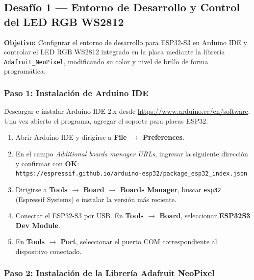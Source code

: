 \documentclass[12pt,leqno]{article}
\begin{document}
\bigskip

\subsection{Desaf\'io 1 --- Entorno de Desarrollo y Control del LED RGB WS2812}
\label{sec:desafio1}

\textbf{Objetivo:} Configurar el entorno de desarrollo para ESP32-S3 en Arduino IDE
y controlar el LED RGB WS2812 integrado en la placa mediante la librer\'ia
\texttt{Adafruit\_NeoPixel}, modificando su color y nivel de brillo de forma
program\'atica.

\subsubsection*{Paso 1: Instalaci\'on de Arduino IDE}

Descargar e instalar Arduino IDE 2.x desde \url{https://www.arduino.cc/en/software}.
Una vez abierto el programa, agregar el soporte para placas ESP32.

\begin{enumerate}[(1)]
    \item Abrir Arduino IDE y dirigirse a \textbf{File $\rightarrow$ Preferences}.
    \item En el campo \textit{Additional boards manager URLs}, ingresar la siguiente
    direcci\'on y confirmar con \textbf{OK}: \\
    \texttt{https://espressif.github.io/arduino-esp32/package\_esp32\_index.json}
    \item Dirigirse a \textbf{Tools $\rightarrow$ Board $\rightarrow$ Boards Manager},
    buscar \texttt{esp32} (Espressif Systems) e instalar la versi\'on m\'as reciente.
    \item Conectar el ESP32-S3 por USB. En \textbf{Tools $\rightarrow$ Board},
    seleccionar \textbf{ESP32S3 Dev Module}.
    \item En \textbf{Tools $\rightarrow$ Port}, seleccionar el puerto COM
    correspondiente al dispositivo conectado.
\end{enumerate}

\pagebreak
\subsubsection*{Paso 2: Instalaci\'on de la Librer\'ia Adafruit NeoPixel}
\end{document}
